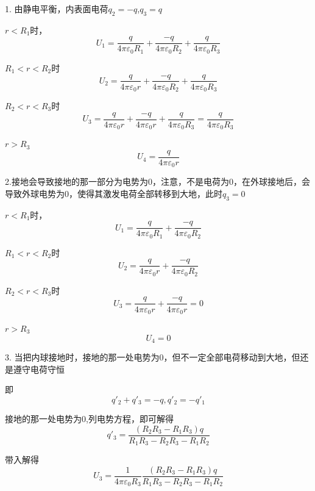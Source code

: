 \documentclass[lang=cn,10pt]{elegantbook}
\begin{document}
		\begin{solution}
			1. 由静电平衡，内表面电荷$q_{2}=-q$,$q_{3}=q$
			
			$r<R_{1}$时，
			\begin{equation*}
				U_1=\frac{q}{4\pi \varepsilon _0R_1}+\frac{-q}{4\pi \varepsilon _0R_2}+\frac{q}{4\pi \varepsilon _0R_3}
			\end{equation*}
			
			$R_{1}<r<R_{2}$时
			\begin{equation*}
				U_2=\frac{q}{4\pi \varepsilon _0r}+\frac{-q}{4\pi \varepsilon _0R_2}+\frac{q}{4\pi \varepsilon _0R_3}
			\end{equation*}
			
			$R_{2}<r<R_{3}$时
			\begin{equation*}
				U_3=\frac{q}{4\pi \varepsilon _0r}+\frac{-q}{4\pi \varepsilon _0r}+\frac{q}{4\pi \varepsilon _0R_3}=\frac{q}{4\pi \varepsilon _0R_3}
			\end{equation*}
			
			$	r>R_{3}$
			\begin{equation*}
				U_4=\frac{q}{4\pi \varepsilon_0 r}
			\end{equation*}
			
			2.接地会导致接地的那一部分为电势为0，注意，不是电荷为0，在外球接地后，会导致外球电势为0，使得其激发电荷全部转移到大地，此时$q_{3}=0$
			
			$r<R_{1}$时，
			\begin{equation*}
				U_1=\frac{q}{4\pi \varepsilon _0R_1}+\frac{-q}{4\pi \varepsilon _0R_2}
			\end{equation*}
			
			$R_{1}<r<R_{2}$时
			\begin{equation*}
				U_2=\frac{q}{4\pi \varepsilon _0r}+\frac{-q}{4\pi \varepsilon _0R_2}
			\end{equation*}
			
			$R_{2}<r<R_{3}$时
			\begin{equation*}
				U_3=\frac{q}{4\pi \varepsilon _0r}+\frac{-q}{4\pi \varepsilon_0 r}=0
			\end{equation*}
			
			$	r>R_{3}$
			\begin{equation*}
				U_4=0
			\end{equation*}
			
			3. 当把内球接地时，接地的那一处电势为0，但不一定全部电荷移动到大地，但还是遵守电荷守恒
			
			即
			\begin{equation*}
				q'_{2}+q'_{3}=-q,q'_{2}=-q'_{1}
			\end{equation*}
			
			接地的那一处电势为0,列电势方程，即可解得
			\begin{equation*}
				q'_{3}=\frac{\left( R_2R_3-R_1R_3 \right) q}{R_1R_3-R_2R_3-R_1R_2}
			\end{equation*}
			
			带入解得
			\begin{equation*}
				U_3=\frac{1}{4\pi \varepsilon _0R_3}\frac{\left( R_2R_3-R_1R_3 \right) q}{R_1R_3-R_2R_3-R_1R_2}
			\end{equation*}
		\end{solution}
\end{document}
